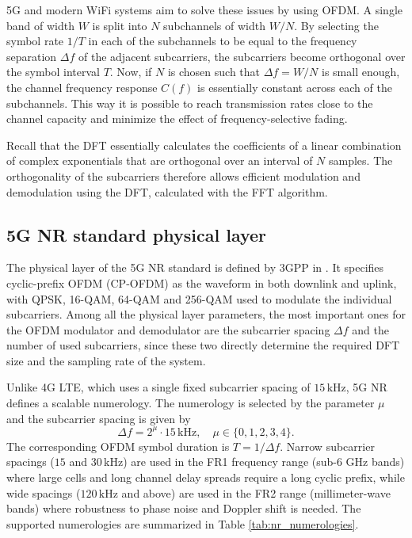\documentclass[a4paper,12pt, master]{etf}
\begin{document}
5G and modern WiFi systems aim to solve these issues by using OFDM. A single band of width $W$ is split into $N$ subchannels of width $W/N$. By selecting the symbol rate $1/T$ in each of the subchannels to be equal to the frequency separation $\Delta f$ of the adjacent subcarriers, the subcarriers become orthogonal over the symbol interval $T$. Now, if $N$ is chosen such that $\Delta f = W/N$ is small enough, the channel frequency response $C(f)$ is essentially constant across each of the subchannels. This way it is possible to reach transmission rates close to the channel capacity and minimize the effect of frequency-selective fading.

Recall that the DFT essentially calculates the coefficients of a linear combination of complex exponentials that are orthogonal over an interval of $N$ samples. The orthogonality of the subcarriers therefore allows efficient modulation and demodulation using the DFT, calculated with the FFT algorithm.

\subsection{5G NR standard physical layer}

The physical layer of the 5G NR standard is defined by 3GPP in \cite{17}. It specifies cyclic-prefix OFDM (CP-OFDM) as the waveform in both downlink and uplink, with QPSK, 16-QAM, 64-QAM and 256-QAM used to modulate the individual subcarriers. Among all the physical layer parameters, the most important ones for the OFDM modulator and demodulator are the subcarrier spacing $\Delta f$ and the number of used subcarriers, since these two directly determine the required DFT size and the sampling rate of the system.

Unlike 4G LTE, which uses a single fixed subcarrier spacing of $15\,\mathrm{kHz}$, 5G NR defines a scalable numerology. The numerology is selected by the parameter $\mu$ and the subcarrier spacing is given by
\begin{equation}
    \Delta f = 2^{\mu} \cdot 15\,\mathrm{kHz}, \quad \mu \in \{0, 1, 2, 3, 4\}.
\label{eq:nr_numerology}
\end{equation}
The corresponding OFDM symbol duration is $T = 1/\Delta f$. Narrow subcarrier spacings ($15$ and $30\,\mathrm{kHz}$) are used in the FR1 frequency range (sub-6 GHz bands) where large cells and long channel delay spreads require a long cyclic prefix, while wide spacings ($120\,\mathrm{kHz}$ and above) are used in the FR2 range (millimeter-wave bands) where robustness to phase noise and Doppler shift is needed. The supported numerologies are summarized in Table \ref{tab:nr_numerologies}.
\end{document}
